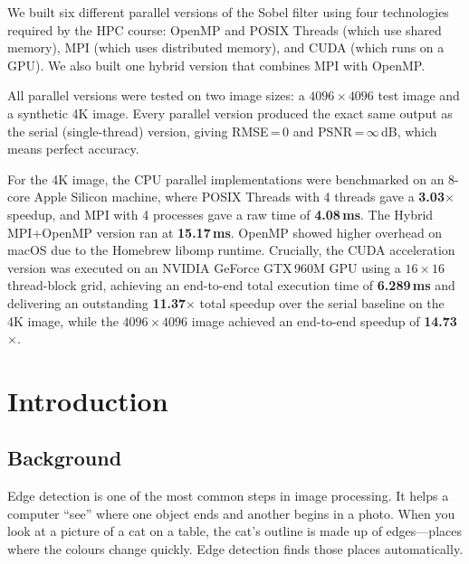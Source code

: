 \documentclass[12pt,a4paper]{article}
\begin{document}
We built six different parallel versions of the Sobel filter using four
technologies required by the HPC course: OpenMP and POSIX Threads (which use
shared memory), MPI (which uses distributed memory), and CUDA (which runs on a
GPU). We also built one hybrid version that combines MPI with OpenMP.

All parallel versions were tested on two image sizes: a $4096\times4096$ test image
and a synthetic 4K image. Every parallel version produced the exact
same output as the serial (single-thread) version, giving RMSE\,=\,0 and
PSNR\,=\,$\infty$\,dB, which means perfect accuracy.

For the 4K image, the CPU parallel implementations were benchmarked on an 8-core
Apple Silicon machine, where POSIX Threads with 4 threads gave a \textbf{3.03$\times$}
speedup, and MPI with 4 processes gave a raw time of \textbf{4.08\,ms}. The Hybrid
MPI+OpenMP version ran at \textbf{15.17\,ms}. OpenMP showed higher overhead on macOS
due to the Homebrew libomp runtime. Crucially, the CUDA acceleration version was executed
on an NVIDIA GeForce GTX\,960M GPU using a $16\times16$ thread-block grid, achieving an
end-to-end total execution time of \textbf{6.289\,ms} and delivering an outstanding
\textbf{11.37$\times$} total speedup over the serial baseline on the 4K image, while the
$4096\times4096$ image achieved an end-to-end speedup of \textbf{14.73$\times$}.

\clearpage
{}
{}
\label{contents}
\tableofcontents
\clearpage

\section{Introduction}

\subsection{Background}

Edge detection is one of the most common steps in image processing. It helps
a computer ``see'' where one object ends and another begins in a photo. When
you look at a picture of a cat on a table, the cat's outline is made up of
edges---places where the colours change quickly. Edge detection finds those
places automatically.
\end{document}

